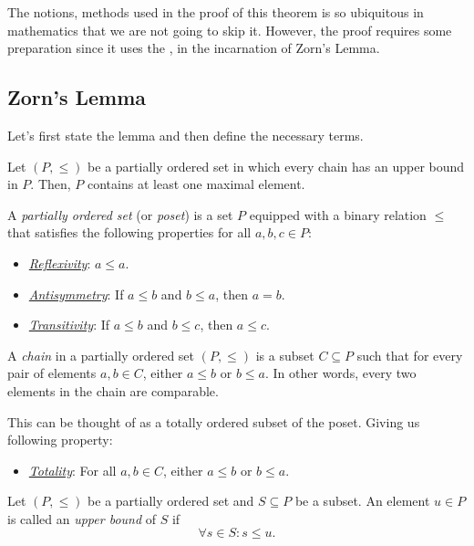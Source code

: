 The notions, methods used in the proof of this theorem is so ubiquitous in mathematics that we are not going to skip it. However, the proof requires some preparation since it uses the , in the incarnation of Zorn's Lemma.

\subsection{Zorn's Lemma}

Let's first state the lemma and then define the necessary terms.
\begin{lemma}
	Let \((P, \leq)\) be a partially ordered set in which every chain has an upper bound in \(P\). Then, \(P\) contains at least one maximal element.
\end{lemma}
\begin{definition}
	A \emph{partially ordered set} (or \emph{poset}) is a set \(P\) equipped with a binary relation \(\leq\) that satisfies the following properties for all \(a, b, c \in P\):
	\begin{itemize}
		\item \uline{\emph{Reflexivity}}: \(a \leq a\).
		\item \uline{\emph{Antisymmetry}}: If \(a \leq b\) and \(b \leq a\), then \(a = b\).
		\item \uline{\emph{Transitivity}}: If \(a \leq b\) and \(b \leq c\), then \(a \leq c\).
	\end{itemize}
\end{definition}
\begin{definition}[Chain]
	A \emph{chain} in a partially ordered set \((P, \leq)\) is a subset \(C \subseteq P\) such that for every pair of elements \(a, b \in C\), either \(a \leq b\) or \(b \leq a\). In other words, every two elements in the chain are comparable.

	This can be thought of as a totally ordered subset of the poset. Giving us following property:
	\begin{itemize}
		\item \uline{\emph{Totality}}: For all \(a, b \in C\), either \(a \leq b\) or \(b \leq a\).
	\end{itemize}
\end{definition}
\begin{definition}
	Let \((P, \leq)\) be a partially ordered set and \(S \subseteq P\) be a subset. An element \(u \in P\) is called an \emph{upper bound} of \(S\) if
	\begin{equation}
		\forall s \in S: s \leq u.
	\end{equation}
\end{definition}
